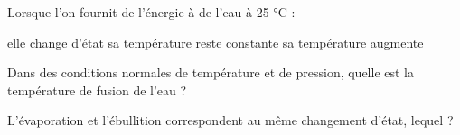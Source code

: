 \begin{questions}
		\vspace*{1cm}
		\question[2] Lorsque l'on fournit de l'énergie à de l'eau à 25 °C :
		\begin{checkboxes}
			\choice elle change d'état
			\choice sa température reste constante
			\correctchoice sa température augmente
		\end{checkboxes}
	
		\vspace*{1cm}
		\question[2] Dans des conditions normales de température et de pression, quelle est la température de fusion de l'eau ?
		
		\fillwithdottedlines{1.5cm}
		
		
			\question[2] L'évaporation et l'ébullition correspondent au même changement d'état, lequel ?
		
		\fillwithdottedlines{1.5cm}  
	\end{questions}
	
